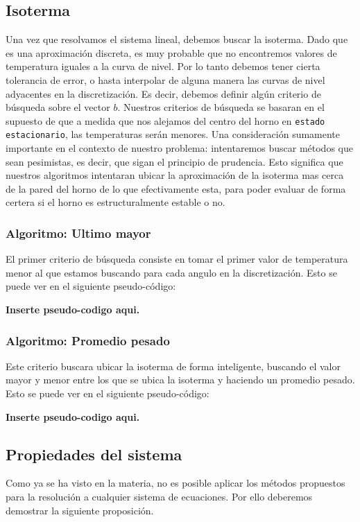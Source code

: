 \subsection{Isoterma}
Una vez que resolvamos el sistema lineal, debemos buscar la isoterma. Dado que es una aproximación discreta, es muy probable que no encontremos valores de temperatura iguales a la curva de nivel. Por lo tanto debemos tener cierta tolerancia de error, o hasta interpolar de alguna manera las curvas de nivel adyacentes en la discretización. Es decir, debemos definir algún criterio de búsqueda sobre el vector $b$. Nuestros criterios de búsqueda se basaran en el supuesto de que a medida que nos alejamos del centro del horno en \texttt{estado estacionario}, las temperaturas serán menores. Una consideración sumamente importante en el contexto de nuestro problema: intentaremos buscar métodos que sean pesimistas, es decir, que sigan el principio de prudencia. Esto significa que nuestros algoritmos intentaran ubicar la aproximación de la isoterma mas cerca de la pared del horno de lo que efectivamente esta, para poder evaluar de forma certera si el horno es estructuralmente estable o no.

\subsubsection{Algoritmo: Ultimo mayor}

El primer criterio de búsqueda consiste en tomar el primer valor de temperatura menor al que estamos buscando para cada angulo en la discretización. Esto se puede ver en el siguiente pseudo-código:

\textbf{Inserte pseudo-codigo aqui.}

\subsubsection{Algoritmo: Promedio pesado}

Este criterio buscara ubicar la isoterma de forma inteligente, buscando el valor mayor y menor entre los que se ubica la isoterma y haciendo un promedio pesado. Esto se puede ver en el siguiente pseudo-código:

\textbf{Inserte pseudo-codigo aqui.}

\subsection{Propiedades del sistema}
Como ya se ha visto en la materia, no es posible aplicar los métodos propuestos para la resoluci\'on a cualquier sistema de ecuaciones. Por ello deberemos demostrar la siguiente proposici\'on.


